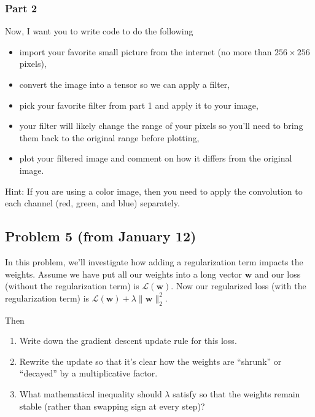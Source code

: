 \documentclass{article}
\begin{document}
\subsubsection*{Part 2}
Now, I want you to write code to do the following
\begin{itemize}
    \item import your favorite small picture from the internet
    (no more than $256 \times 256$ pixels),
    \item convert the image into a tensor so we can apply a filter,
    \item pick your favorite filter from part 1 and apply
    it to your image,
    \item your filter will likely change the range of your pixels
    so you'll need to bring them back to the original range before plotting,
    \item plot your filtered image and comment on how it differs
    from the original image.
\end{itemize}
Hint: If you are using a color image, then you need to apply the convolution
to each channel (red, green, and blue) separately.

%

\subsection*{Problem 5 (from January 12)}
In this problem, we'll investigate how
adding a regularization term 
impacts the weights.
Assume we have put all our weights 
into a long vector $\mathbf{w}$ 
and our loss (without the regularization
term) is $\mathcal{L}(\mathbf{w})$.
Now our regularized loss 
(with the regularization term) is
$\mathcal{L}(\mathbf{w}) + \lambda \|\mathbf{w}\|_2^2.$

Then
\begin{enumerate}
    \item Write down the gradient
    descent update rule for this loss.
    \item Rewrite the update
    so that it's clear how the weights are
    ``shrunk'' or ``decayed'' by
    a multiplicative factor.
    \item What mathematical inequality
    should $\lambda$ satisfy so that
    the weights remain stable
    (rather than swapping sign at every step)?
\end{enumerate}

%
\end{document}
